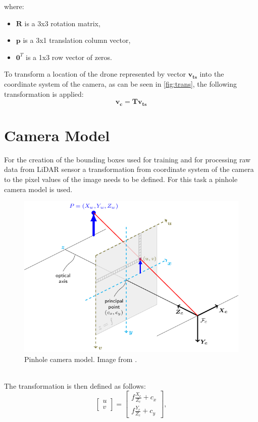 \documentclass[twoside]{ctuthesis}
\theoremstyle{plain}
\theoremstyle{definition}
\theoremstyle{note}
\begin{document}
where:
\begin{itemize}
	\item $\textbf{R}$ is a 3x3 rotation matrix,
	\item $\textbf{p}$ is a 3x1 translation column vector,
	\item $\textbf{0}^T$ is a 1x3 row vector of zeros.
\end{itemize}
To transform a location of the drone represented by vector $\mathbf{v_{ts}}$ into the coordinate system of the camera, as can be seen in \autoref{fig:trans}, the following transformation is applied:
\begin{equation}
	\mathbf{v_c}=\mathbf{T}\mathbf{v_{ts}}
\end{equation}
\section{Camera Model} \label{sec:camera-model}
For the creation of the bounding boxes used for training and for processing raw data from LiDAR sensor a transformation from coordinate system of the camera to the pixel values of the image needs to be defined. For this task a pinhole camera model is used.
\begin{figure}
	\centering
	\includegraphics[width=\textwidth]{pinhole_camera_model.png}
	\caption{Pinhole camera model. Image from \cite{opencv}.}
\end{figure}\\
The transformation is then defined as follows:
\begin{equation} \label{eq:2}
	\begin{bmatrix}
		u\\
		v
	\end{bmatrix}=
	\begin{bmatrix}
		f\frac{X_c}{Z_c}+c_x\\
		f\frac{Y_c}{Z_c}+c_y
	\end{bmatrix},
\end{equation}
\end{document}

